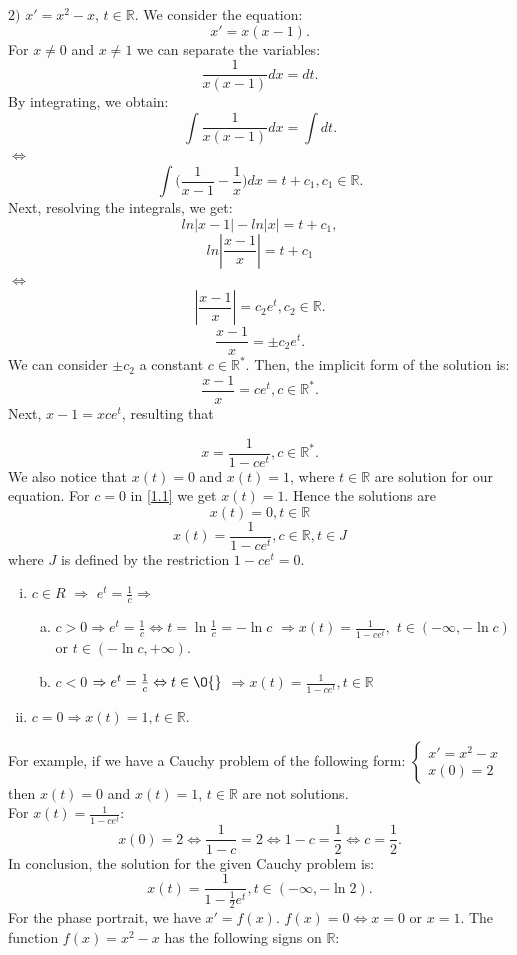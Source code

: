 \documentclass[a4paper,11pt]{report}
\newcommand{\R}{\mathbb{R}}
\begin{document}
$2)$ $x'=x^{2}-x$, $t\in \R.$ We consider the equation: $$x'=x(x-1).$$ For $x\neq0$ and $x\neq1$ we can separate the variables: $$\frac{1}{x(x-1)}dx=dt.$$ By integrating, we obtain: $$\int \frac{1}{x(x-1)} dx = \int dt.$$ $\Leftrightarrow$ $$\int \bigg(\frac{1}{x-1}-\frac{1}{x}\bigg)dx=t+c_{1}, c_{1} \in \R.$$ Next, resolving the integrals, we get:
$$ln|x-1|-ln|x|=t+c_{1},$$ $$ln|\frac{x-1}{x}|=t+c_{1}$$ $\Leftrightarrow$ $$|\frac{x-1}{x}|=c_{2}e^{t}, c_{2} \in \R.$$ $$\frac{x-1}{x}=\pm c_{2} e^{t}.$$ We can consider $\pm c_{2}$ a constant $c \in \R^{*}$. Then, the implicit form of the solution is: $$\frac{x-1}{x}=ce^{t}, c\in \R^{*}.$$ Next, $x-1=xce^{t}$, resulting that 

\begin{equation}
x=\frac{1}{1-ce^{t}}, c\in \R^{*}.
\end{equation}
We also notice that $x(t)=0$ and $x(t)=1$, where $t\in \R$ are solution for our equation. For $c=0$ in \eqref{1.1} we get $x(t)=1$. Hence the solutions are $$x(t)=0, t\in\R$$ $$x(t)=\frac{1}{1-ce^{t}}, c\in \R, t\in J$$ where $J$ is defined by the restriction $1-ce^{t}=0$.
\begin{enumerate}[(i)]
 \item $c \in R$ $\Rightarrow$ $e^{t}=\frac{1}{c}\Rightarrow$
 \begin{enumerate}[(a)]
  \item $c>0\Rightarrow e^{t}=\frac{1}{c} \Leftrightarrow t=\ln{\frac{1}{c}}=-\ln {c}$ $\Rightarrow x(t)=\frac{1}{1-ce^{t}},$ $t\in (-\infty,-\ln{c})$ or $t\in (-\ln{c},+\infty)$.
  \item $c<0$ $\Rightarrow e^{t}=\frac{1}{c} \Leftrightarrow t\in \O{}$ $\Rightarrow x(t)=\frac{1}{1-ce^{t}}, t\in \R$
 \end{enumerate}
 \item $c=0 \Rightarrow x(t)=1, t\in \R.$
\end{enumerate}
For example, if we have a Cauchy problem of the following form:
$\begin{cases}
  x'=x^{2}-x\\
  x(0)=2
 \end{cases}
$
then $x(t)=0$ and $x(t)=1$, $t\in \R$ are not solutions.\\
For $x(t)=\frac{1}{1-ce^{t}}$: $$x(0)=2 \Leftrightarrow \frac{1}{1-c}=2 \Leftrightarrow 1-c=\frac{1}{2} \Leftrightarrow c=\frac{1}{2}.$$ In conclusion, the solution for the given Cauchy problem is:$$x(t)=\frac{1}{1-\frac{1}{2}e^{t}}, t\in (-\infty,-\ln{2}).$$
For the phase portrait, we have $x'=f(x)$. $f(x)=0 \Leftrightarrow x=0$ or $x=1$. The function $f(x)=x^{2}-x$ has the following signs on $\R$:
\end{document}
